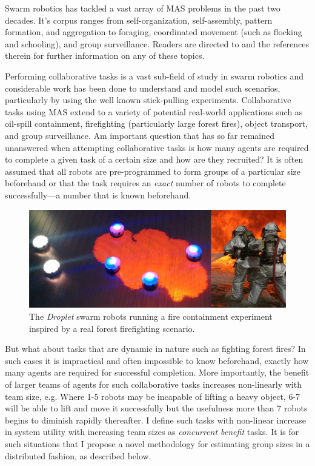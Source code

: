 \documentclass[defaultstyle,12pt]{proposal}
\begin{document}
Swarm robotics has tackled a vast array of MAS problems in the past two decades. It's corpus ranges from self-organization, self-assembly, pattern formation, and aggregation to foraging, coordinated movement (such as flocking and schooling), and group surveillance. Readers are directed to \cite{Bayindir2007} and the references therein for further information on any of these topics. 

Performing collaborative tasks is a vast sub-field of study in swarm robotics and considerable work has been done to understand and model such scenarios, particularly by \cite{Martinoli1995, Martinoli1999b, Agassounon2001, Ijspeert2001, Agassounon2002} using the well known stick-pulling experiments. Collaborative tasks using MAS extend to a variety of potential real-world applications such as oil-spill containment, firefighting (particularly large forest fires), object transport, and group surveillance. Am important question that has so far remained unanswered when attempting collaborative tasks is how many agents are required to complete a given task of a certain size and how are they recruited? It is often assumed that all robots are pre-programmed to form groups of a particular size beforehand or that the task requires an \emph{exact} number of robots to complete successfully---a number that is known beforehand.

\begin{figure}[!tb]
	\centering\includegraphics[width=\textwidth]{../assets/dropletfire.png}
	\centering\caption{The \emph{Droplet} swarm robots running a fire containment experiment inspired by a real forest firefighting scenario.}\label{fig:dropletfire}
\end{figure}

But what about tasks that are dynamic in nature such as fighting forest fires? In such cases it is impractical and often impossible to know beforehand, exactly how many agents are required for successful completion. More importantly, the benefit of larger teams of agents for such collaborative tasks increases non-linearly with team size, e.g. Where 1-5 robots may be incapable of lifting a heavy object, 6-7 will be able to lift and move it successfully but the usefulness more than 7 robots begins to diminish rapidly thereafter. I define such tasks with non-linear increase in system utility with increasing team sizes as \emph{concurrent benefit} tasks. It is for such situations that I propose a novel methodology for estimating group sizes in a distributed fashion, as described below.
\end{document}
